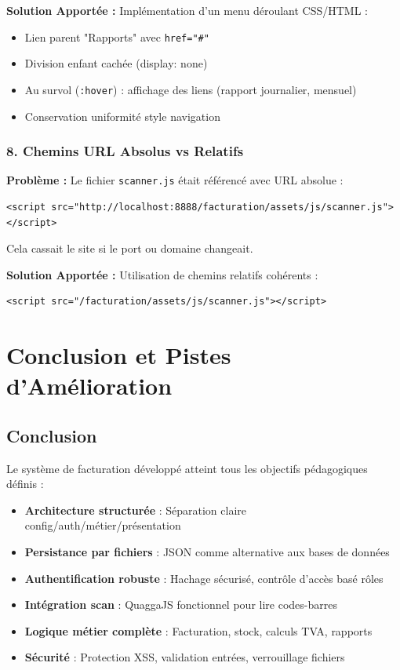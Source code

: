 \documentclass[12pt,a4paper]{report}
\begin{document}
\textbf{Solution Apportée :}
Implémentation d'un menu déroulant CSS/HTML :
\begin{itemize}
    \item Lien parent "Rapports" avec \texttt{href="\#"}
    \item Division enfant cachée (display: none)
    \item Au survol (\texttt{:hover}) : affichage des liens (rapport journalier, mensuel)
    \item Conservation uniformité style navigation
\end{itemize}

\subsection{8. Chemins URL Absolus vs Relatifs}

\textbf{Problème :}
Le fichier \texttt{scanner.js} était référencé avec URL absolue :
\begin{lstlisting}
<script src="http://localhost:8888/facturation/assets/js/scanner.js"></script>
\end{lstlisting}

Cela cassait le site si le port ou domaine changeait.

\textbf{Solution Apportée :}
Utilisation de chemins relatifs cohérents :
\begin{lstlisting}
<script src="/facturation/assets/js/scanner.js"></script>
\end{lstlisting}

\chapter{Conclusion et Pistes d'Amélioration}

\section{Conclusion}

Le système de facturation développé atteint tous les objectifs pédagogiques définis :

\begin{itemize}
    \item \textbf{Architecture structurée} : Séparation claire config/auth/métier/présentation
    \item \textbf{Persistance par fichiers} : JSON comme alternative aux bases de données
    \item \textbf{Authentification robuste} : Hachage sécurisé, contrôle d'accès basé rôles
    \item \textbf{Intégration scan} : QuaggaJS fonctionnel pour lire codes-barres
    \item \textbf{Logique métier complète} : Facturation, stock, calculs TVA, rapports
    \item \textbf{Sécurité} : Protection XSS, validation entrées, verrouillage fichiers
\end{itemize}
\end{document}
